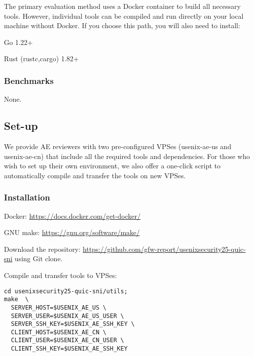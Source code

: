 The primary evaluation method uses a Docker container to
build all necessary tools. However, individual tools
can be compiled and run directly on your local machine
without Docker. If you choose this path,
you will also need to install:
\begin{compactitem}
    \item Go 1.22+
    \item Rust (rustc,cargo) 1.82+
\end{compactitem}

\subsubsection{Benchmarks}
None.

\subsection{Set-up}

We provide AE reviewers with two pre-configured VPSes (usenix-ae-us and usenix-ae-cn)
that include all the required tools and dependencies.
For those who wish to set up their own environment,
we also offer a one-click script to automatically
compile and transfer the tools on new VPSes.


\subsubsection{Installation}

\begin{compactitem}
    \item Docker: \url{https://docs.docker.com/get-docker/}
    \item GNU make: \url{https://gnu.org/software/make/}
    \item Download the repository: \url{https://github.com/gfw-report/usenixsecurity25-quic-sni} using Git clone.
    \item Compile and transfer tools to VPSes:
\begin{verbatim}
cd usenixsecurity25-quic-sni/utils;
make  \
  SERVER_HOST=$USENIX_AE_US \
  SERVER_USER=$USENIX_AE_US_USER \
  SERVER_SSH_KEY=$USENIX_AE_SSH_KEY \
  CLIENT_HOST=$USENIX_AE_CN \
  CLIENT_USER=$USENIX_AE_CN_USER \
  CLIENT_SSH_KEY=$USENIX_AE_SSH_KEY

\end{verbatim}
\end{compactitem}

